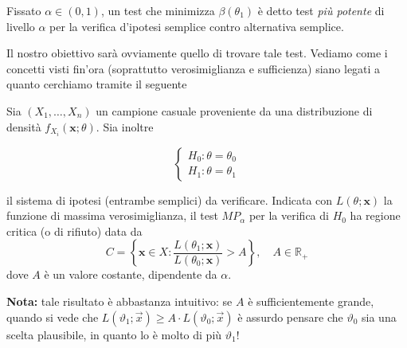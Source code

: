 \begin{dfn}
 Fissato \(\alpha \in (0,1)\), un test che minimizza \(\beta(\theta_1)\) è detto test \emph{più potente} di livello \(\alpha\) per la verifica d'ipotesi semplice contro alternativa semplice. 
\end{dfn}

Il nostro obiettivo sarà ovviamente quello di trovare tale test. Vediamo come i concetti visti fin'ora (soprattutto verosimiglianza e sufficienza) siano legati a quanto cerchiamo tramite il seguente

\begin{lem}
Sia \((X_1,\dots,X_n)\) un campione casuale proveniente da una distribuzione di densità \(f_{X_i}(\mathbf{x}; \theta)\).
Sia inoltre

\begin{equation*}
  \begin{cases}
    H_0 \colon \theta = \theta_0 \\ H_1 \colon \theta = \theta_1
  \end{cases}
\end{equation*}

il sistema di ipotesi (entrambe semplici) da verificare. Indicata con \(L(\theta;\mathbf{x})\) la funzione di massima verosimiglianza, 
il test $MP_\alpha$ per la verifica di \(H_0\) ha regione critica (o di rifiuto) data da
\begin{equation*}
  C = \left\lbrace \mathbf{x} \in X \colon
      \frac{L(\theta_1;\mathbf{x})}{L(\theta_0;\mathbf{x})} > A
      \right\rbrace, \quad A \in \mathbb{R}_+
\end{equation*}
dove \(A\) è un valore costante, dipendente da \(\alpha{}\).
\end{lem}
\textbf{Nota:} tale risultato è abbastanza intuitivo: se $A$ è sufficientemente grande, 
quando si vede che $L(\vartheta_1;\vec{x}) \geq A \cdot L(\vartheta_0;\vec{x})$ 
è assurdo pensare che $\vartheta_0$ sia una scelta plausibile, in quanto lo è molto di più $\vartheta_1$!

